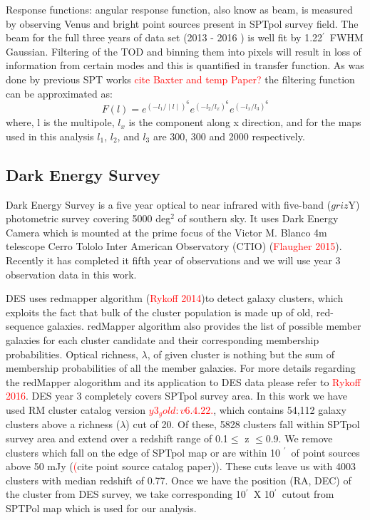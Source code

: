 \documentclass[usenatbib, twocolumn, nofootinbib, reprint]{aastex61}
\newcommand{\pending}[1]{\textcolor{red}{#1}}
\newcommand{\am}{$^{\prime}$}
\begin{document}
Response functions: angular response function, also know as beam, is measured by observing Venus and bright point sources present in SPTpol survey field. 
The beam for the full three years of data set (2013 - 2016 ) is well fit by 1.22\am\ FWHM Gaussian. 
Filtering of the TOD and binning them into pixels will result in loss of information from certain modes and this is quantified in transfer function. 
As was done by previous SPT works \pending{cite Baxter and temp Paper?} the filtering function can be approximated as:
\begin{equation}
F(l) = e^{(-l_{1}/ \mid l \mid)^{6}}  e^{(-l_{2}/ l_{x})^{6} }  e^{(-l_{x}/ l_{3})^{6} }
\end{equation}
where, l is the multipole, $l_{x}$ is the component along x direction, and for the maps used in this analysis $l_{1}$, $l_{2}$, and $l_{3}$ are 300, 300 and 2000 respectively.

\subsection{Dark Energy Survey}
Dark Energy Survey is a five year optical to near infrared with five-band ($griz$Y) photometric survey covering 5000 deg$^{2}$ of southern sky. 
It uses Dark Energy Camera which is mounted at the prime focus of the Victor M. Blanco 4m telescope Cerro Tololo Inter American Observatory (CTIO) (\pending {Flaugher 2015}).
Recently it has completed it fifth year of observations and we will use year 3 observation data in this work.

DES uses redmapper algorithm (\pending{Rykoff 2014})to detect galaxy clusters, which exploits the fact that bulk of the cluster population is made up of old, red-sequence galaxies. 
redMapper algorithm also provides the list of possible member galaxies for each cluster candidate and their corresponding membership probabilities.
Optical richness, $\lambda $, of given cluster is nothing but the sum of membership probabilities of all the member galaxies. 
For more details regarding the redMapper alogorithm and its application to DES data please refer to \pending{Rykoff 2016}.
DES year 3 completely covers SPTpol survey area. 
In this work we have used RM cluster catalog version \pending{$y3_gold:v6.4.22.$}, which contains 54,112 galaxy clusters above a richness ($\lambda$) cut of 20. 
Of these, 5828 clusters fall within SPTpol survey area and extend over a redshift range of 0.1$\leq$ z $\leq$0.9. 
We remove clusters which fall on the edge of SPTpol map or are within 10 \am\ of point sources above 50 mJy (\pending(cite point source catalog paper)).
These cuts leave us with 4003 clusters with median redshift of 0.77.
Once we have the position (RA, DEC) of the cluster from DES survey, we take corresponding 10\am\ X 10\am\ cutout from SPTPol map which is used for our analysis.
\end{document}
